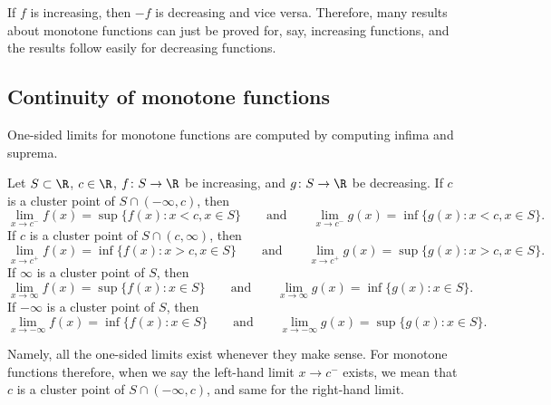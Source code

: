 If $f$ is increasing, then $-f$ is decreasing and vice versa.  Therefore,
many results about monotone functions can just be proved for, say, increasing
functions, and the results follow easily for decreasing functions.

\subsection{Continuity of monotone functions}

One-sided limits for monotone functions are computed
by computing infima and suprema.

\begin{prop} \label{prop:monotlimits}
Let $S \subset \R$, $c \in \R$,
$f \colon S \to \R$ be increasing,
and
$g \colon S \to \R$ be decreasing.
If $c$ is a cluster point of $S \cap (-\infty,c)$, then
\begin{equation*}
\lim_{x \to c^-} f(x) = \sup \{ f(x) : x < c, x \in S \}
\qquad \text{and} \qquad
\lim_{x \to c^-} g(x) = \inf \{ g(x) : x < c, x \in S \} .
\end{equation*}
If $c$ is a cluster point of $S \cap (c,\infty)$, then
\begin{equation*}
\lim_{x \to c^+} f(x) = \inf \{ f(x) : x > c, x \in S \}
\qquad \text{and} \qquad
\lim_{x \to c^+} g(x) = \sup \{ g(x) : x > c, x \in S \} .
\end{equation*}
If $\infty$ is a cluster point of $S$, then
\begin{equation*}
\lim_{x \to \infty} f(x) = \sup \{ f(x) : x \in S \}
\qquad \text{and} \qquad
\lim_{x \to \infty} g(x) = \inf \{ g(x) : x \in S \} .
\end{equation*}
If $-\infty$ is a cluster point of $S$, then
\begin{equation*}
\lim_{x \to -\infty} f(x) = \inf \{ f(x) : x \in S \}
\qquad \text{and} \qquad
\lim_{x \to -\infty} g(x) = \sup \{ g(x) : x \in S \} .
\end{equation*}
\end{prop}

Namely, all the one-sided limits exist whenever they make
sense.  For monotone functions therefore, when we say
the left-hand limit $x \to c^-$
exists, we mean that $c$ is a cluster point of $S \cap (-\infty,c)$,
and same for the right-hand limit.

